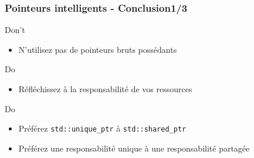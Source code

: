 \documentclass[C++.tex]{subfiles}
\begin{document}
\begin{frame}[fragile]
	\frametitle{Pointeurs intelligents - Conclusion\titlehfill{}1/3}
	\begin{alertblock}{Don't}
		\begin{itemize}
			\item N'utilisez pas de pointeurs bruts possédants
		\end{itemize}
	\end{alertblock}

	\begin{exampleblock}{Do}
		\begin{itemize}
			\item Réfléchissez à la responsabilité de vos ressources
		\end{itemize}
	\end{exampleblock}

	\begin{exampleblock}{Do}
		\begin{itemize}
			\item Préférez \lstinline|std::unique_ptr| à \lstinline|std::shared_ptr|
			\item Préférez une responsabilité unique à une responsabilité partagée

		\end{itemize}
	\end{exampleblock}
\end{frame}
\end{document}
